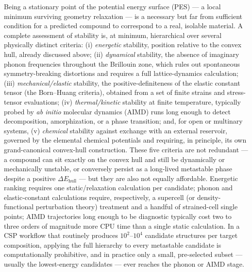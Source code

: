 \documentclass[journal=jpccck,manuscript=article]{achemso}
\begin{document}
Being a stationary point of the potential energy surface (PES) --- a local
minimum surviving geometry relaxation --- is a necessary but far from
sufficient condition for a predicted compound to correspond to a real,
isolable material. A complete assessment of stability is, at minimum,
hierarchical over several physically distinct criteria: (i) \emph{energetic}
stability, position relative to the convex hull, already discussed above;
(ii) \emph{dynamical} stability, the absence of imaginary phonon frequencies
throughout the Brillouin zone, which rules out spontaneous symmetry-breaking
distortions and requires a full lattice-dynamics
calculation;\cite{togo2015} (iii) \emph{mechanical/elastic} stability, the
positive-definiteness of the elastic constant tensor (the Born--Huang
criteria), obtained from a set of finite strains and stress-tensor
evaluations;\cite{mouhat2014} (iv) \emph{thermal/kinetic} stability at finite
temperature, typically probed by \emph{ab initio} molecular dynamics (AIMD)
runs long enough to detect decomposition, amorphization, or a phase
transition;\cite{cohen2025} and, for open or multinary systems, (v)
\emph{chemical} stability against exchange with an external reservoir,
governed by the elemental chemical potentials and requiring, in principle,
its own grand-canonical convex-hull construction. These five criteria are
not redundant --- a compound can sit exactly on the convex hull and still be
dynamically or mechanically unstable, or conversely persist as a
long-lived metastable phase despite a positive $\Delta E_\text{hull}$ --- but
they are also not equally affordable. Energetic ranking requires one
static/relaxation calculation per candidate; phonon and elastic-constant
calculations require, respectively, a supercell (or density-functional
perturbation theory) treatment and a handful of strained-cell single points;
AIMD trajectories long enough to be diagnostic typically cost two to three
orders of magnitude more CPU time than a single static calculation. In a
CSP workflow that routinely produces $10^2$--$10^4$ candidate structures per
target composition, applying the full hierarchy to every metastable
candidate is computationally prohibitive, and in practice only a small,
pre-selected subset --- usually the lowest-energy candidates --- ever reaches
the phonon or AIMD stage.
\end{document}
